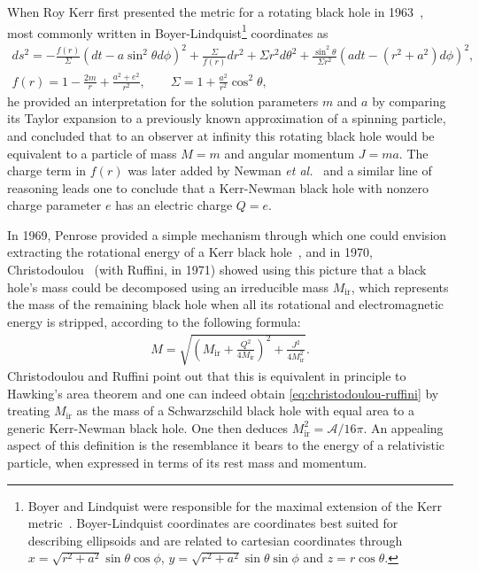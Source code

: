 \documentclass[
twoside,openright,frontopenright]{dmathesis}
\newcommand{\nn}{\nonumber}
\newcommand{\todoopt}[2][]{\todo[color=blue!20,size=\footnotesize,#1]{#2}}
\begin{document}
When Roy Kerr first presented the metric for a rotating black hole in
1963~\cite{Kerr:1963ud}, most commonly written in Boyer-Lindquist\footnote{Boyer
  and Lindquist were responsible for the maximal extension of the Kerr
  metric~\cite{Boyer:1966qh}. Boyer-Lindquist coordinates are coordinates best
  suited for describing ellipsoids and are related to cartesian coordinates
  through $ x = \sqrt{r^2+a^2}\sin\theta\cos\phi$,
  $y = \sqrt{r^2 + a^2}\sin\theta \sin \phi$ and $z=r\cos\theta$.} coordinates
as
\begin{gather}
  ds^2 = -\frac{f(r)}{\Sigma}(dt - a \sin^2 \theta d\phi)^2 +
  \frac{\Sigma}{f(r)}dr^2 + \Sigma r^2 d\theta^2 + \frac{\sin^2\theta}{\Sigma
  r^2}(adt - (r^2+a^2)d\phi)^2,\nn\\
  f(r) = 1- \frac{2m}{r} + \frac{a^2+e^2}{r^2}, \qquad \Sigma = 1+\frac{a^2}{r^2}\cos^2\theta,
  \label{eq:kerrAF}
\end{gather}
\todoopt{find potentials}
he provided an interpretation for the solution parameters $m$ and $a$ by
comparing its Taylor expansion to a previously known approximation of a spinning
particle, and concluded that to an observer at infinity this rotating black hole
would be equivalent to a particle of mass $M=m$ and angular momentum $J=ma$. The
charge term in $f(r)$ was later added by Newman \emph{et
  al.}~\cite{Newman:1965my} and a similar line of reasoning leads one to
conclude that a Kerr-Newman black hole with nonzero charge parameter $e$ has an
electric charge $Q = e$.

In 1969, Penrose provided a simple mechanism through which one could envision
extracting the rotational energy of a Kerr black hole~\cite{Penrose:1969pc}, and
in 1970, Christodoulou~\cite{Christodoulou:1970wf,Christodoulou:1972kt} (with
Ruffini, in 1971) showed using this picture that a black hole's mass could be
decomposed using an irreducible mass $M_\mathrm{ir}$, which represents the mass
of the remaining black hole when all its rotational and electromagnetic energy
is stripped, according to the following formula:
\begin{align}
  \label{eq:christodoulou-ruffini}
  M=\sqrt{\left(M_\mathrm{ir}+\frac{Q^2}{4M_\mathrm{ir}}\right)^2 + \frac{J^2}{4M_\mathrm{ir}^2}}.
\end{align}
Christodoulou and Ruffini point out that this is equivalent in principle to
Hawking's area theorem and one can indeed obtain \cref{eq:christodoulou-ruffini}
by treating $M_\mathrm{ir}$ as the mass of a Schwarzschild black hole with equal
area to a generic Kerr-Newman black hole. One then deduces
$M_\mathrm{ir}^2 = \mathcal{A}/16\pi$. An appealing aspect of this definition is
the resemblance it bears to the energy of a relativistic particle, when
expressed in terms of its rest mass and momentum.
\end{document}
